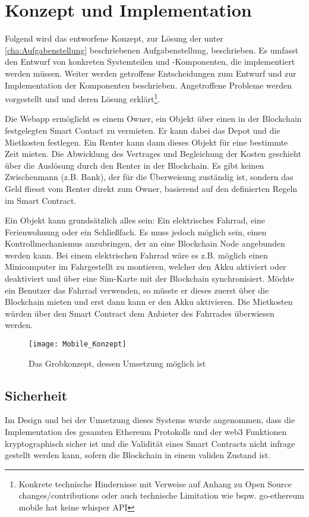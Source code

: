 \section{Konzept und Implementation}
\label{sec:Konzeption}
Folgend wird das entworfene Konzept, zur Lösung der unter \ref{cha:Aufgabenstellung} beschriebenen Aufgabenstellung, beschrieben. Es umfasst den Entwurf von konkreten Systemteilen und -Komponenten, die implementiert werden müssen. Weiter werden getroffene Entscheidungen zum Entwurf und zur Implementation der Komponenten beschrieben. Angetroffene Probleme werden vorgestellt und und deren Lösung erklärt\footnote{Konkrete technische Hindernisse mit Verweise auf Anhang zu Open Source changes/contributions oder auch technische Limitation wie bspw. go-ethereum mobile hat keine whisper API}.

Die Webapp ermöglicht es einem Owner, ein Objekt über einen in der Blockchain festgelegten Smart Contact zu vermieten. Er kann dabei das Depot und die Mietkosten festlegen. Ein Renter kann dann dieses Objekt für eine bestimmte Zeit mieten. Die Abwicklung des Vertrages und Begleichung der Kosten geschieht über die Auslösung durch den Renter in der Blockchain. Es gibt keinen Zwischenmann (z.B. Bank), der für die Überweisung zuständig ist, sondern das Geld fliesst vom Renter direkt zum Owner, basierend auf den definierten Regeln im Smart Contract.

Ein Objekt kann grundsätzlich alles sein: Ein elektrisches Fahrrad, eine Ferienwohnung oder ein Schließfach. Es muss jedoch möglich sein, einen Kontrollmechanismus anzubringen, der an eine Blockchain Node angebunden werden kann. Bei einem elektrischen Fahrrad wäre es z.B. möglich einen Minicomputer im Fahrgestellt zu montieren, welcher den Akku aktiviert oder deaktiviert und über eine Sim-Karte mit der Blockchain synchronisiert. Möchte ein Benutzer das Fahrrad verwenden, so müsste er dieses zuerst über die Blockchain mieten und erst dann kann er den Akku aktivieren. Die Mietkosten würden über den Smart Contract dem Anbieter des Fahrrades überwiesen werden.

\begin{figure}
\centering
\texttt{[image: Mobile\_Konzept]}
\caption{Das Grobkonzept, dessen Umsetzung möglich ist}
\label{fig:Mobile_Konzept}
\end{figure}

\subsection{Sicherheit}
Im Design und bei der Umsetzung dieses Systems wurde angenommen, dass die Implementation des gesamten Ethereum Protokolls und der web3 Funktionen kryptographisch sicher ist und die Validität eines Smart Contracts nicht infrage gestellt werden kann, sofern die Blockchain in einem validen Zustand ist.\cite{github.com/ethereum/web3js, go-ethereum}

